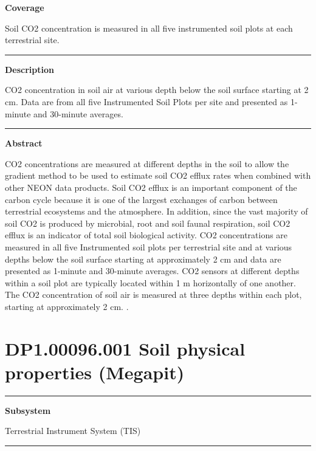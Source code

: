 \documentclass[]{article}
\begin{document}
\textbf{Coverage}

Soil CO2 concentration is measured in all five instrumented soil plots
at each terrestrial site.

\begin{center}\rule{0.5\linewidth}{\linethickness}\end{center}

\textbf{Description}

CO2 concentration in soil air at various depth below the soil surface
starting at 2 cm. Data are from all five Instrumented Soil Plots per
site and presented as 1-minute and 30-minute averages.

\begin{center}\rule{0.5\linewidth}{\linethickness}\end{center}

\textbf{Abstract}

CO2 concentrations are measured at different depths in the soil to allow
the gradient method to be used to estimate soil CO2 efflux rates when
combined with other NEON data products. Soil CO2 efflux is an important
component of the carbon cycle because it is one of the largest exchanges
of carbon between terrestrial ecosystems and the atmosphere. In
addition, since the vast majority of soil CO2 is produced by microbial,
root and soil faunal respiration, soil CO2 efflux is an indicator of
total soil biological activity. CO2 concentrations are measured in all
five Instrumented soil plots per terrestrial site and at various depths
below the soil surface starting at approximately 2 cm and data are
presented as 1-minute and 30-minute averages. CO2 sensors at different
depths within a soil plot are typically located within 1 m horizontally
of one another. The CO2 concentration of soil air is measured at three
depths within each plot, starting at approximately 2 cm. \newpage
.

\section{DP1.00096.001 Soil physical properties
(Megapit)}\label{dp1.00096.001-soil-physical-properties-megapit}

\begin{center}\rule{0.5\linewidth}{\linethickness}\end{center}

\textbf{Subsystem}

Terrestrial Instrument System (TIS)

\begin{center}\rule{0.5\linewidth}{\linethickness}\end{center}
\end{document}
